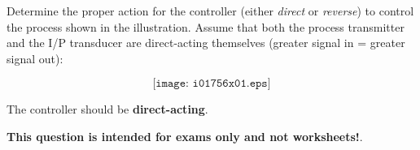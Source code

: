 

Determine the proper action for the controller (either {\it direct} or {\it reverse}) to control the process shown in the illustration.  Assume that both the process transmitter and the I/P transducer are direct-acting themselves (greater signal in = greater signal out):

$$\texttt{[image: i01756x01.eps]}$$







The controller should be {\bf direct-acting}.







{\bf This question is intended for exams only and not worksheets!}.



